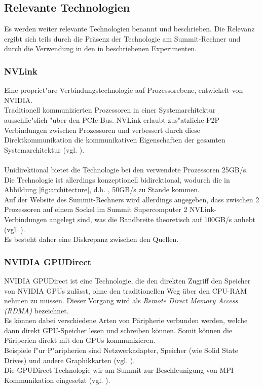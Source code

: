 \subsection{Relevante Technologien}
Es werden weiter relevante Technologien benannt und beschrieben. Die Relevanz ergibt sich teils durch die Präsenz der Technologie am Summit-Rechner und durch die Verwendung in den in \cite{mainpaper} beschriebenen Experimenten.

\subsubsection{ NVLink }
Eine propriet"are Verbindungstechnologie auf Prozessorebene, entwickelt von NVIDIA.\\
Traditionell kommunizierten Prozessoren in einer Systemarchitektur ausschlie"slich "uber den PCIe-Bus. NVLink erlaubt zus"atzliche P2P Verbindungen zwischen Prozessoren und verbessert durch diese Direktkommunikation die kommunikativen Eigenschaften der gesamten Systemarchitektur (vgl. \cite{nvlink}).\\
\\
Unidirektional bietet die Technologie bei den verwendete Prozessoren 25GB/s. Die Technologie ist allerdings konzeptionell bidirektional, wodurch die in Abbildung \ref{fig:architecture}, d.h. \cite[Abb. 1]{mainpaper}, 50GB/s zu Stande kommen.\\
Auf der Website des Summit-Rechners wird allerdings angegeben, dass zwischen 2 Prozessoren auf einem Sockel im Summit Supercomputer 2 NVLink-Verbindungen angelegt sind, was die Bandbreite theoretisch auf 100GB/s anhebt (vgl. \cite[FAQ, What is NVLink?]{osummit}).\\
Es besteht daher eine Diskrepanz zwischen den Quellen.

\subsubsection{ NVIDIA GPUDirect }
NVIDIA GPUDirect ist eine Technologie, die den direkten Zugriff den Speicher von NVIDIA GPUs zulässt, ohne den traditionellen Weg über den CPU-RAM nehmen zu müssen. Dieser Vorgang wird als \textit{Remote Direct Memory Access (RDMA)} bezeichnet.\\
Es können dabei verschiedene Arten von Päripherie verbunden werden, welche dann direkt GPU-Speicher lesen und schreiben können. Somit können die Päriperien direkt mit den GPUs kommunizieren.\\
Beispiele f"ur P"aripherien sind Netzwerkadapter, Speicher (wie Solid State Drives) und andere Graphikkarten (vgl. \cite{gpud}).\\
Die GPUDirect Technologie wir am Summit zur Beschleunigung von MPI-Kommunikation eingesetzt (vgl. \cite[Kap. 1]{mainpaper}).

